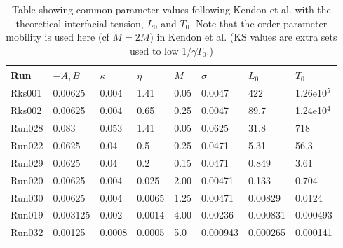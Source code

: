 \begin{table}
\begin{center}
\begin{tabular}{llllllll}
\hline
Run & $-A, B$ & $\kappa$ & $\eta$ & $M$ & $\sigma$  & $L_0$ & $T_0$ \\
\hline
Rks001 & 0.00625 & 0.004 & 1.41 & 0.05 & 0.0047 & 422 & 1.26e10$^5$\\
Rks002 & 0.00625 & 0.004 & 0.65 & 0.25 & 0.0047 & 89.7 & 1.24e10$^4$\\
Run028 & 0.083 & 0.053 & 1.41 & 0.05  & 0.0625 & 31.8 & 718 \\
Run022 & 0.0625 & 0.04 & 0.5 & 0.25   & 0.0471 & 5.31 & 56.3 \\
Run029 & 0.0625 & 0.04 & 0.2 & 0.15   & 0.0471 & 0.849 & 3.61 \\
Run020 & 0.00625 & 0.004 & 0.025 & 2.00 & 0.00471 & 0.133 & 0.704 \\
Run030 & 0.00625 & 0.004 & 0.0065 & 1.25 & 0.00471 & 0.00829 & 0.0124 \\
Run019 & 0.003125 & 0.002 & 0.0014 & 4.00 & 0.00236 & 0.000831 & 0.000493 \\
Run032 & 0.00125  & 0.0008 & 0.0005 & 5.0 & 0.000943 & 0.000265 & 0.000141\\
\hline  
\end{tabular}
\end{center}
\caption{Table showing common parameter values following Kendon et al.
with the theoretical interfacial tension, $L_0$ and $T_0$. Note that
the order parameter mobility is used here (cf $\tilde{M} = 2M$) in
Kendon et al. (KS values are extra sets used to low 1/$\dot{\gamma}T_0$.)}
\label{tab:r1}
\end{table} 

